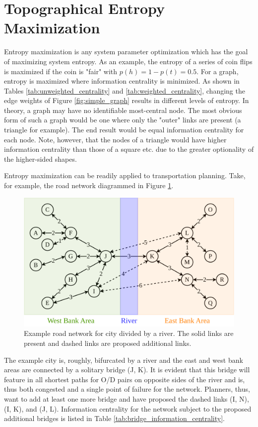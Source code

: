 \section{Topographical Entropy Maximization}

Entropy maximization is any system parameter optimization which has the goal of maximizing system entropy. As an example, the entropy of a series of coin flips is maximized if the coin is "fair" with $p(h) = 1 - p(t) = 0.5$. For a graph, entropy is maximized where information centrality is minimized. As shown in Tables \ref{tab:unweighted_centrality} and \ref{tab:weighted_centrality}, changing the edge weights of Figure \ref{fig:simple_graph} results in different levels of entropy. In theory, a graph may have no identifiable most-central node. The most obvious form of such a graph would be one where only the "outer" links are present (a triangle for example). The end result would be equal information centrality for each node. Note, however, that the nodes of a triangle would have higher information centrality than those of a square etc. due to the greater optionality of the higher-sided shapes.

Entropy maximization can be readily applied to transportation planning. Take, for example, the road network diagrammed in Figure \ref{fig:divided_network}.

\begin{figure}[H]
	\centering
	\includegraphics[width = .8\linewidth]{figs/divided_network.png}
	\caption{Example road network for city divided by a river. The solid links are present and dashed links are proposed additional links.}
	\label{fig:divided_network}
\end{figure}

The example city is, roughly, bifurcated by a river and the east and west bank areas are connected by a solitary bridge (J, K). It is evident that this bridge will feature in all shortest paths for O/D pairs on opposite sides of the river and is, thus both congested and a single point of failure for the network. Planners, thus, want to add at least one more bridge and have proposed the dashed links (I, N), (I, K), and (J, L). Information centrality for the network subject to the proposed additional bridges is listed in Table \ref{tab:bridge_information_centrality}.

